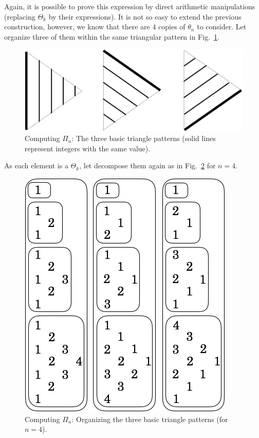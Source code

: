 Again, it is possible to prove this expression by direct arithmetic manipulations
(replacing $\Theta_k$ by their expressions). 
It is not so easy to extend the previous construction, however, we know that there are $4$ copies of $\theta_n$ to consider.
Let organize three of them within the same triangular pattern in Fig.~\ref{fig:Tetrahedral6}.
\begin{figure}[h]
\begin{center}
        \includegraphics[scale=0.35]{FiguresArithmetic/appTetrahedral6}
        \caption{Computing $\Pi_n$: The three basic triangle patterns (solid lines represent integers with the same value).}
        \label{fig:Tetrahedral6}
\end{center}
\end{figure}
As each element is a $\Theta_k$, let decompose them again as in Fig.~\ref{fig:Tetrahedral7} for $n=4$.
\begin{figure}[h]
\begin{center}
        \includegraphics[scale=0.36]{FiguresArithmetic/appTetrahedral7}
        \caption{Computing $\Pi_n$: Organizing the three basic triangle patterns (for $n=4$).}
        \label{fig:Tetrahedral7}
\end{center}
\end{figure}
